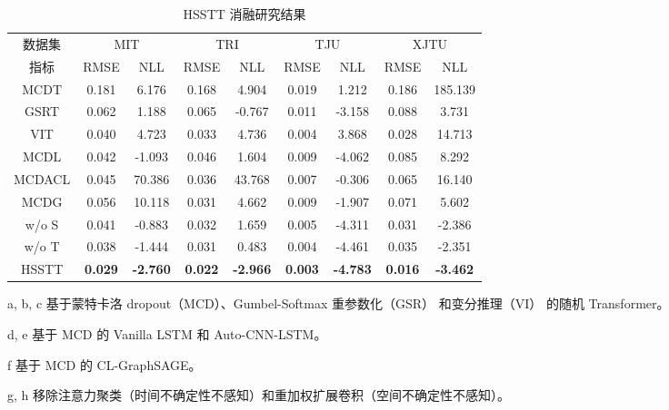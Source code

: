 \documentclass[UTF8,journal,twoside,web]{ieeecolor}
\begin{document}
\begin{table}[!t]
    \centering
    \caption{HSSTT 消融研究结果}
    \resizebox{\linewidth}{!}
      {
    \begin{threeparttable}
      
        \begin{tabular}{ccccccccc}
      \toprule
      数据集 & \multicolumn{2}{c}{MIT} & \multicolumn{2}{c}{TRI} & \multicolumn{2}{c}{TJU} & \multicolumn{2}{c}{{XJTU}} \\
      \cmidrule{2-9} 指标 & RMSE  & NLL   & RMSE  & NLL   & RMSE  & NLL & {RMSE}  & {NLL} \\
      \midrule
      MCDT\tnote{a} & 0.181  & 6.176  & 0.168  & 4.904  & 0.019  & 1.212 & {0.186} & {185.139} \\
      GSRT\tnote{b} & 0.062 & 1.188 & 0.065 & -0.767 & 0.011 & -3.158 & {0.088} & {3.731} \\
      {VIT\tnote{c}} & {0.040} & {4.723} & {0.033} & {4.736} & {0.004} & {3.868} & {0.028} & {14.713} \\
      {MCDL\tnote{d}} & {0.042} & {-1.093} & {0.046} & {1.604} & {0.009} & {-4.062} & {0.085} & {8.292}  \\
      {MCDACL\tnote{e}} & {0.045} & {70.386} & {0.036} & {43.768} & {0.007} & {-0.306} & {0.065} & {16.140} \\
      {MCDG\tnote{f}} & {0.056} & {10.118} & {0.031} & {4.662} & {0.009} & {-1.907} & {0.071} & {5.602} \\
      w/o S\tnote{{g}} & 0.041  & -0.883  & 0.032  & 1.659  & 0.005  & -4.311 & {0.031} & {-2.386} \\
      w/o T\tnote{{h}} & 0.038  & -1.444  & 0.031  & 0.483  & 0.004  & -4.461 & {0.035} & {-2.351}  \\
      HSSTT  & \textbf{0.029} & \textbf{-2.760} & \textbf{0.022} & \textbf{-2.966} & \textbf{0.003} & \textbf{-4.783} & {\textbf{0.016}} & {\textbf{-3.462}} \\
      \bottomrule
      \end{tabular}
      
      \begin{tablenotes}
        \item[{a, b, c}] {基于蒙特卡洛 dropout（MCD）\cite{20164903082858}、Gumbel-Softmax 重参数化（GSR）\cite{20193407356730} 和变分推理（VI）\cite{20191806851746} 的随机 Transformer。}
        \item[{d, e}] {基于 MCD 的 Vanilla LSTM\cite{sak2014long} 和 Auto-CNN-LSTM\cite{9137406}。}
        \item[{f}] {基于 MCD 的 CL-GraphSAGE\cite{YAO2023106437}。}
        \item[{g, h}] 移除注意力聚类（时间不确定性不感知）和重加权扩展卷积（空间不确定性不感知）。
    \end{tablenotes}
    
  \end{threeparttable}
  }
    \label{tab:ablation_study_1}%
  \end{table}%
\end{document}
